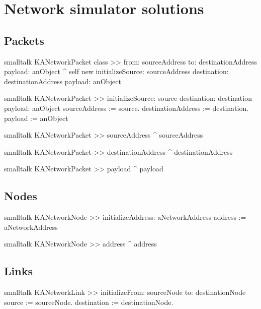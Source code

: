 \documentclass[10pt,twoside,english]{_support/latex/sbabook/sbabook}
\begin{document}
\frontmatter
\pagestyle{plain}

\tableofcontents*
\clearpage\listoffigures

\mainmatter

\chapter{Network simulator solutions}\section{Packets}
\begin{displaycode}{smalltalk}
KANetworkPacket class >> from: sourceAddress to: destinationAddress payload: anObject
    ^ self new
        initializeSource: sourceAddress
        destination: destinationAddress
        payload: anObject
\end{displaycode}

\begin{displaycode}{smalltalk}
KANetworkPacket >> initializeSource: source destination: destination payload: anObject
    sourceAddress := source.
    destinationAddress := destination.
    payload := anObject
\end{displaycode}

\begin{displaycode}{smalltalk}
KANetworkPacket >> sourceAddress
    ^ sourceAddress
\end{displaycode}

\begin{displaycode}{smalltalk}
KANetworkPacket >> destinationAddress
    ^ destinationAddress
\end{displaycode}

\begin{displaycode}{smalltalk}
KANetworkPacket >> payload
    ^ payload
\end{displaycode}
\section{Nodes}
\begin{displaycode}{smalltalk}
KANetworkNode >> initializeAddress: aNetworkAddress
    address := aNetworkAddress
\end{displaycode}

\begin{displaycode}{smalltalk}
KANetworkNode >> address
    ^ address
\end{displaycode}
\section{Links}
\begin{displaycode}{smalltalk}
KANetworkLink >> initializeFrom: sourceNode to: destinationNode
    source := sourceNode.
    destination := destinationNode.
\end{displaycode}
\end{document}
